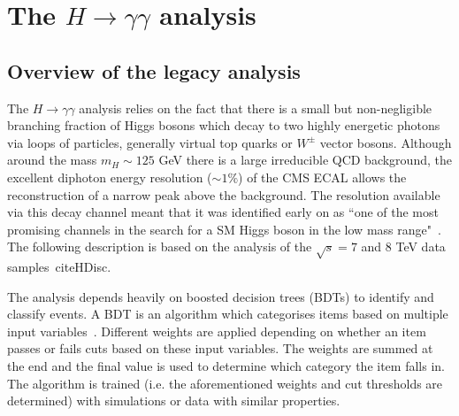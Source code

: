 \documentclass[10pt]{article}
\begin{document}
\section{The $H \rightarrow \gamma \gamma$ analysis}

\subsection{Overview of the legacy analysis}

The $H \rightarrow \gamma \gamma$ analysis relies on the fact that there is a small but non-negligible branching fraction of Higgs bosons which decay to two highly energetic photons via loops of particles, generally virtual top quarks or $W^{\pm}$ vector bosons. Although around the mass $m_H \sim 125$ GeV there is a large irreducible QCD background, the excellent diphoton energy resolution ($\sim 1 \%$) of the CMS ECAL allows the reconstruction of a narrow peak above the background. The resolution available via this decay channel meant that it was identified early on as “one of the most promising channels in the search for a SM Higgs boson in the low mass range"~\cite{Seez}. The following description is based on the analysis of the $\sqrt{s}=7$ and $8$ TeV data samples~cite{HDisc}.

The analysis depends heavily on boosted decision trees (BDTs) to identify and classify events. A BDT is an algorithm which categorises items based on multiple input variables~\cite{BDT}. Different weights are applied depending on whether an item passes or fails cuts based on these input variables. The weights are summed at the end and the final value is used to determine which category the item falls in. The algorithm is trained (i.e. the aforementioned weights and cut thresholds are determined) with simulations or data with similar properties. %
\end{document}
